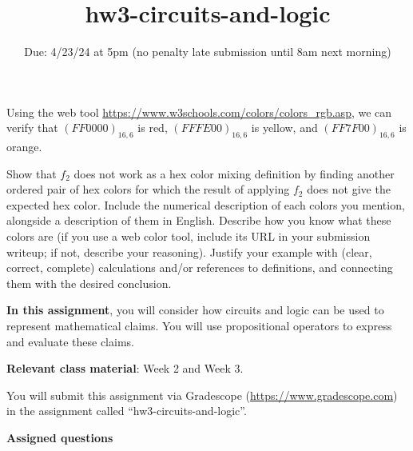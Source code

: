 \begin{enumerate}[labelindent=0pt, leftmargin=0pt]
\begin{enumerate}
Using the web tool \url{https://www.w3schools.com/colors/colors_rgb.asp}, we can verify that $(FF0000)_{16,6}$ is red, 
$(FFFE00)_{16,6}$ is yellow, and $(FF7F00)_{16,6}$ is orange.

Show that $f_2$ does not work as a hex color mixing definition by finding
another ordered pair of hex colors for which the result of applying $f_2$ does not give the expected hex color.
Include the numerical description of each colors you mention, alongside a description of them in English. 
Describe how you know what these colors are
(if you use a web color tool, include its URL in your submission writeup; if not, describe your reasoning).
Justify your 
example with (clear, correct, complete) calculations and/or references to definitions, and connecting them with
the desired conclusion.
\end{enumerate}
\end{enumerate}
\newpage


\title{hw3-circuits-and-logic}
\date{Due: 4/23/24 at 5pm (no penalty late submission until 8am next morning)}

\maketitle
\thispagestyle{fancy}

{\bf In this assignment}, you will consider how circuits and logic can be used to represent
mathematical claims. You will use propositional operators
to express and evaluate these claims.

{\bf Relevant class material}: Week 2 and Week 3.

You will submit this assignment via Gradescope
(\href{https://www.gradescope.com}{https://www.gradescope.com}) 
in the assignment called ``hw3-circuits-and-logic''.

\instructions

{\bf Assigned questions}

